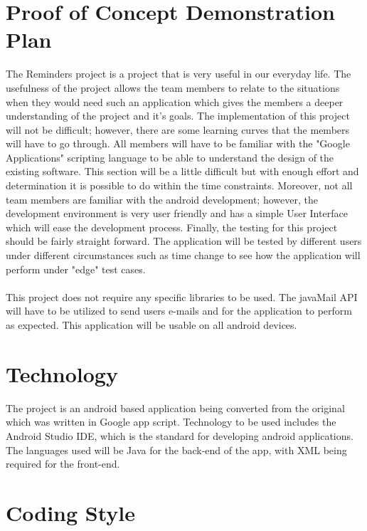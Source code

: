 \documentclass[a4paper]{article}
\begin{document}
\section{Proof of Concept Demonstration Plan}
    \label{sec:ProofOfConcept}
    The Reminders project is a project that is very useful in our everyday life. The usefulness of the project allows the team members to relate to the situations when they would need such an application which gives the members a deeper understanding of the project and it's goals. The implementation of this project will not be difficult; however, there are some learning curves that the members will have to go through. All members will have to be familiar with the "Google Applications" scripting language to be able to understand the design of the existing software. This section will be a little difficult but with enough effort and determination it is possible to do within the time constraints. Moreover, not all team members are familiar with the android development; however, the development environment is very user friendly and has a simple User Interface which will ease the development process. Finally, the testing for this project should be fairly straight forward. The application will be tested by different users under different circumstances such as time change to see how the application will perform under "edge" test cases.\\ \\
    
    This project does not require any specific libraries to be used. The javaMail API will have to be utilized to send users e-mails and for the application to perform as expected. This application will be usable on all android devices. 
    

\section{Technology}
    \label{sec:Technology}

    The project is an android based application being converted from the original which was written in Google app script. Technology to be used includes the Android Studio IDE, which is the standard for developing android applications. The languages used will be Java for the back-end of the app, with XML being required for the front-end.

\section{Coding Style}
    \label{sec:CodingStyle}
\end{document}
